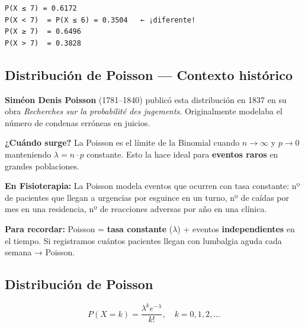 \documentclass[
  letterpaper,
  DIV=11,
  numbers=noendperiod]{scrartcl}
\begin{document}
\begin{verbatim}
P(X ≤ 7) = 0.6172 
P(X < 7)  = P(X ≤ 6) = 0.3504   ← ¡diferente! 
P(X ≥ 7)  = 0.6496 
P(X > 7)  = 0.3828
\end{verbatim}

\subsection{Distribución de Poisson --- Contexto
histórico}\label{distribucion-de-poisson-contexto-historico}

\textbf{Siméon Denis Poisson} (1781--1840) publicó esta distribución en
1837 en su obra \emph{Recherches sur la probabilité des jugements}.
Originalmente modelaba el número de condenas erróneas en juicios.

\textbf{¿Cuándo surge?} La Poisson es el límite de la Binomial cuando
\(n \to \infty\) y \(p \to 0\) manteniendo \(\lambda = n \cdot p\)
constante. Esto la hace ideal para \textbf{eventos raros} en grandes
poblaciones.

\textbf{En Fisioterapia:} La Poisson modela eventos que ocurren con tasa
constante: nº de pacientes que llegan a urgencias por esguince en un
turno, nº de caídas por mes en una residencia, nº de reacciones adversas
por año en una clínica.

\begin{tcolorbox}[enhanced jigsaw, arc=.35mm, bottomrule=.15mm, bottomtitle=1mm, breakable, colback=white, colbacktitle=quarto-callout-tip-color!10!white, colframe=quarto-callout-tip-color-frame, coltitle=black, left=2mm, leftrule=.75mm, opacityback=0, opacitybacktitle=0.6, rightrule=.15mm, title=\textcolor{quarto-callout-tip-color}{\faLightbulb}\hspace{0.5em}{Tip}, titlerule=0mm, toprule=.15mm, toptitle=1mm]

\textbf{Para recordar:} Poisson = \textbf{tasa constante} (\(\lambda\))
+ eventos \textbf{independientes} en el tiempo. Si registramos cuántos
pacientes llegan con lumbalgia aguda cada semana → Poisson.

\end{tcolorbox}

\subsection{Distribución de Poisson}\label{distribucion-de-poisson}

\begin{tcolorbox}[enhanced jigsaw, arc=.35mm, bottomrule=.15mm, bottomtitle=1mm, breakable, colback=white, colbacktitle=quarto-callout-note-color!10!white, colframe=quarto-callout-note-color-frame, coltitle=black, left=2mm, leftrule=.75mm, opacityback=0, opacitybacktitle=0.6, rightrule=.15mm, title=\textcolor{quarto-callout-note-color}{\faInfo}\hspace{0.5em}{Note}, titlerule=0mm, toprule=.15mm, toptitle=1mm]

\[P(X = k) = \frac{\lambda^k e^{-\lambda}}{k!}, \quad k = 0, 1, 2, \ldots\]

\end{tcolorbox}
\end{document}
